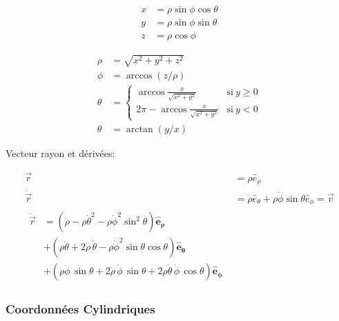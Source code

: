 \documentclass[10pt,a4paper]{article}
\begin{document}
\begin{multicols}{3}

\begin{align*}
x & = \rho \sin \phi \cos \theta \\
y & = \rho \sin \phi \sin \theta \\
z & = \rho \cos \phi
\end{align*}

\columnbreak



\columnbreak


\begin{align*}
\rho   &= \sqrt{x^2+y^2+z^2}\\
\phi &= \arccos(z/\rho)\\
\theta &= \begin{cases}\arccos\frac{x}{\sqrt{x^2+y^2}} & \mathrm{si}\ y\geq{0} \\ 2\pi-\arccos\frac x{\sqrt{x^2+y^2}} & \mathrm{si}\ y < 0\end{cases}\\
\theta &= \arctan(y/x)
\end{align*}

\end{multicols}

Vecteur rayon et dérivées:

\begin{align*}
\vec{r} &= \rho \hat{e}_{\rho} \\
\dot{\vec{r}} &= \dot{\rho}\hat{e}_{\theta} + \rho\dot{\phi}\sin\theta\hat{e}_{\phi} = \vec{v} \\
\begin{split}
\ddot{\vec{r}} &= \left( \ddot{\rho} - \rho\dot\theta^2 - \rho\dot\phi^2\sin^2\theta \right)\mathbf{\hat{e}_\rho} \\
&+ \left( \rho\ddot\theta + 2\dot{\rho}\,\dot\theta - \rho\dot\phi^2\sin\theta\cos\theta \right) \mathbf{\hat{e}_\theta}\\
&+ \left( \rho\ddot\phi\,\sin\theta + 2\dot{\rho}\,\dot\phi\,\sin\theta + 2 \rho\dot\theta\,\dot\phi\,\cos\theta \right) \mathbf{\hat{e}_\phi} 
\end{split}
\end{align*}

\subsubsection{Coordonnées Cylindriques}
\end{document}
